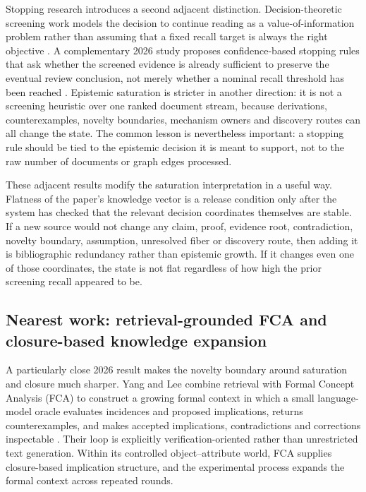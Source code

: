 \documentclass[11pt]{article}
\begin{document}
Stopping research introduces a second adjacent distinction. Decision-theoretic screening work models the decision to continue reading as a value-of-information problem rather than assuming that a fixed recall target is always the right objective \cite{fletcher2026}. A complementary 2026 study proposes confidence-based stopping rules that ask whether the screened evidence is already sufficient to preserve the eventual review conclusion, not merely whether a nominal recall threshold has been reached \cite{fletcher2026b}. Epistemic saturation is stricter in another direction: it is not a screening heuristic over one ranked document stream, because derivations, counterexamples, novelty boundaries, mechanism owners and discovery routes can all change the state. The common lesson is nevertheless important: a stopping rule should be tied to the epistemic decision it is meant to support, not to the raw number of documents or graph edges processed.

These adjacent results modify the saturation interpretation in a useful way. Flatness of the paper's knowledge vector is a release condition only after the system has checked that the relevant decision coordinates themselves are stable. If a new source would not change any claim, proof, evidence root, contradiction, novelty boundary, assumption, unresolved fiber or discovery route, then adding it is bibliographic redundancy rather than epistemic growth. If it changes even one of those coordinates, the state is not flat regardless of how high the prior screening recall appeared to be.

\subsection{Nearest work: retrieval-grounded FCA and closure-based knowledge expansion}

A particularly close 2026 result makes the novelty boundary around saturation and closure much sharper. Yang and Lee combine retrieval with Formal Concept Analysis (FCA) to construct a growing formal context in which a small language-model oracle evaluates incidences and proposed implications, returns counterexamples, and makes accepted implications, contradictions and corrections inspectable \cite{yanglee2026fca}. Their loop is explicitly verification-oriented rather than unrestricted text generation. Within its controlled object--attribute world, FCA supplies closure-based implication structure, and the experimental process expands the formal context across repeated rounds.
\end{document}
